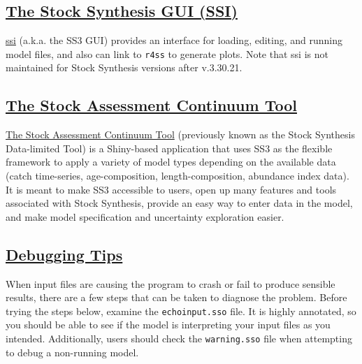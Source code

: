 \hypertarget{SSI}{}
\subsection[The Stock Synthesis GUI (SSI)]{\protect\hyperlink{SSI}{The Stock Synthesis GUI (SSI)}}
\href{https://vlab.noaa.gov/web/stock-synthesis/document-library/-/document_library/0LmuycloZeIt/view/5042951}{\gls{ssi}} (a.k.a. the SS3 GUI) provides an interface for loading, editing, and running model files, and also can link to \texttt{r4ss} to generate plots. Note that \gls{ssi} is not maintained for Stock Synthesis versions after v.3.30.21.

\hypertarget{SAC}{}
\subsection[The Stock Assessment Continuum Tool]{\protect\hyperlink{SAC}{The Stock Assessment Continuum Tool}}
\href{https://github.com/shcaba/SS-DL-tool}{The Stock Assessment Continuum Tool} (previously known as the Stock Synthesis Data-limited Tool) is a Shiny-based application that uses SS3 as the flexible framework to apply a variety of model types depending on the available data (catch time-series, age-composition, length-composition, abundance index data). It is meant to make SS3 accessible to users, open up many features and tools associated with Stock Synthesis, provide an easy way to enter data in the model, and make model specification and uncertainty exploration easier.

\hypertarget{Debugging}{}
\subsection[Debugging Tips]{\protect\hyperlink{Debugging}{Debugging Tips}}
When input files are causing the program to crash or fail to produce sensible results, there are a few steps that can be taken to diagnose the problem. Before trying the steps below, examine the \texttt{echoinput.sso} file. It is highly annotated, so you should be able to see if the model is interpreting your input files as you intended.  Additionally, users should check the \texttt{warning.sso} file when attempting to debug a non-running model.

